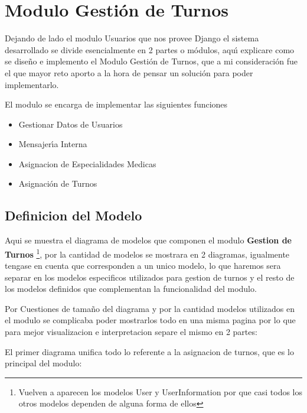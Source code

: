 \section{Modulo Gesti\'on de Turnos}

Dejando de lado el modulo Usuarios que nos provee Django el sistema desarrollado 
se divide esencialmente en 2 partes o m\'odulos, aqu\'{\i} explicare como se dise\~no e
implemento el Modulo Gesti\'on de Turnos, que a mi consideraci\'on fue el que mayor
reto aporto a la hora de pensar un soluci\'on para poder implementarlo.

El modulo se encarga de implementar las siguientes funciones

\begin{itemize}
    \item Gestionar Datos de Usuarios
    \item Mensajer\'{\i}a Interna
    \item Asignacion de Especialidades Medicas
    \item Asignaci\'on de Turnos
\end{itemize}


\subsection{Definicion del Modelo}

Aqui se muestra el diagrama de modelos que componen el modulo \textbf{Gestion 
de Turnos} \footnote{Vuelven a aparecen los modelos User y UserInformation por 
que casi todos los otros modelos dependen de alguna forma de ellos}, por la 
cantidad de modelos se mostrara en 2 diagramas, igualmente tengase en cuenta
que corresponden a un unico modelo, lo que haremos sera separar en los modelos
especificos utilizados para gestion de turnos y el resto de los modelos 
definidos que complementan la funcionalidad del modulo.

Por Cuestiones de tamaño del diagrama y por la cantidad modelos utilizados en 
el modulo se complicaba poder mostrarlos todo en una misma pagina por lo que 
para mejor visualizacion e interpretacion separe el mismo en 2 partes:

El primer diagrama unifica todo lo referente a la asignacion de turnos, que es lo 
principal del modulo:

